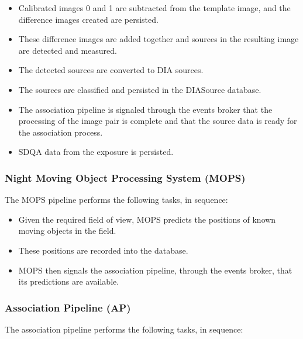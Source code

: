 \begin{itemize}
\item Calibrated images 0 and 1 are subtracted from the template
image, and the difference images created are persisted.

\item These difference images are added together and sources
in the resulting image are detected and measured.

\item The detected sources are converted to DIA sources.

\item The sources are classified and persisted in the DIASource database.

\item The association pipeline is signaled through the events broker
that the processing of the image pair is complete and that the source
data is ready for the association process.

\item SDQA data from the exposure is persisted.

\end{itemize}

\subsubsection{Night Moving Object Processing System (MOPS)}

The MOPS pipeline performs the following tasks, in sequence:

\begin{itemize}

\item Given the required field of view, MOPS predicts the positions 
of known moving objects in the field.

\item These positions are recorded into the database.

\item MOPS then signals the association pipeline, through the events
broker, that its predictions are available.

\end{itemize}

\subsubsection{Association Pipeline (AP)}

The association pipeline performs the following tasks, in sequence:


